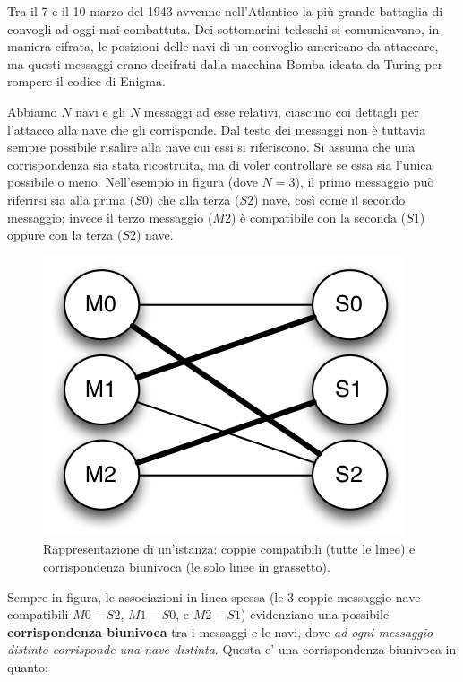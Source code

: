 \renewcommand{\nomebreve}{convoglio}
\renewcommand{\titolo}{La battaglia del convoglio - {\large ripreso dalle OII 2012}\\}

\introduzione{}

Tra il 7 e il 10 marzo del 1943 avvenne nell'Atlantico la più grande battaglia di convogli ad oggi mai combattuta. Dei sottomarini tedeschi si comunicavano, in maniera cifrata, le posizioni delle navi di un convoglio americano da attaccare, ma questi messaggi erano decifrati dalla macchina Bomba ideata da Turing per rompere il codice di Enigma.

Abbiamo $N$ navi e gli $N$ messaggi ad esse relativi, ciascuno coi dettagli per l'attacco alla nave che gli corrisponde. Dal testo dei messaggi non è tuttavia sempre possibile risalire alla nave cui essi si riferiscono. Si assuma che una corrispondenza sia stata ricostruita, ma di voler controllare se essa sia l'unica possibile o meno.
Nell'esempio in figura (dove $N=3$), il primo messaggio può riferirsi sia alla prima ($S0$) che alla terza ($S2$) nave, così come il secondo messaggio; invece il terzo messaggio ($M2$) è compatibile con la seconda ($S1$) oppure con la terza ($S2$) nave. 
    
\begin{figure}[h!]
  \centering
  \includegraphics{figura.png}
  \caption{Rappresentazione di un'istanza: coppie compatibili (tutte le linee) e corrispondenza biunivoca (le solo linee in grassetto).}
\end{figure}

Sempre in figura, le associazioni in linea spessa (le 3 coppie messaggio-nave compatibili $M0-S2$, $M1-S0$, e $M2-S1$) evidenziano una possibile \textbf{corrispondenza biunivoca} tra i messaggi e le navi, dove \emph{ad ogni messaggio distinto corrisponde una nave distinta}. Questa e' una corrispondenza biunivoca in quanto:

